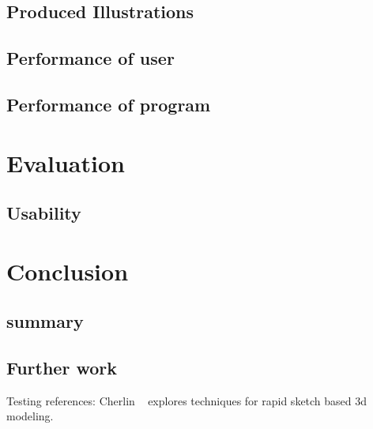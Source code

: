 \documentclass[a4paper,10pt]{article}
\begin{document}
\subsection{Produced Illustrations}
\subsection{Performance of user}
\subsection{Performance of program}

\section{Evaluation}
\subsection{Usability}

\section{Conclusion}
\subsection{summary}
\subsection{Further work}


Testing references: Cherlin ~\cite{Cherlin:2005:SMF:1090122.1090145} explores techniques for rapid sketch based 3d modeling.


{}

\end{document}
